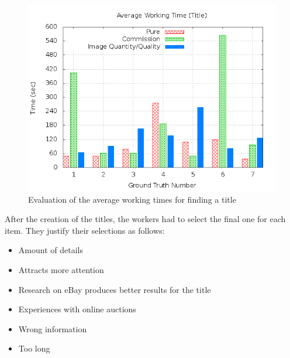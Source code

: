 \begin{figure}
\centering
\includegraphics[scale=0.55]{images/plots/crowdsourcing/plot_time_title.png}
\caption{Evaluation of the average working times for finding a title}
\label{crowdsourcing_time_title}
\end{figure}

After the creation of the titles, the workers had to select the final one for each item. They justify their selections as follows:
\begin{itemize}
	\item Amount of details 
	\item Attracts more attention 
	\item Research on eBay produces better results for the title 
	\item Experiences with online auctions 
	\item Wrong information 
	\item Too long 
\end{itemize}


